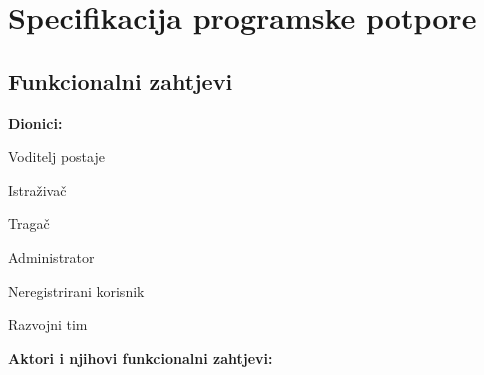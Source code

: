 \chapter{Specifikacija programske potpore}
		
	\section{Funkcionalni zahtjevi}
			
			
			\noindent \textbf{Dionici:}
			
			\begin{packed_enum}
				
				\item Voditelj postaje
				\item Istraživač	
				\item Tragač
				\item Administrator
				\item Neregistrirani korisnik
				\item Razvojni tim
				
				
			\end{packed_enum}
			
			\noindent \textbf{Aktori i njihovi funkcionalni zahtjevi:}
			
